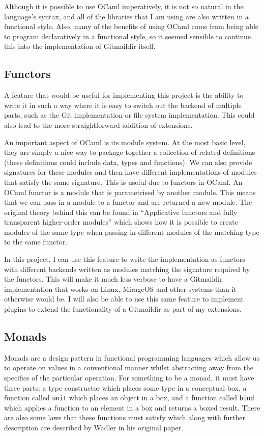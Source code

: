 Although it is possible to use OCaml imperatively, it is not so natural in the language's syntax, and all of the libraries that I am using are also written in a functional style. Also, many of the benefits of using OCaml come from being able to program declaratively in a functional style, so it seemed sensible to continue this into the implementation of Gitmaildir itself.

\subsection{Functors}

A feature that would be useful for implementing this project is the ability to write it in such a way where it is easy to switch out the backend of multiple parts, such as the Git implementation or file system implementation. This could also lead to the more straightforward addition of extensions.

An important aspect of OCaml is its module system. At the most basic level, they are simply a nice way to package together a collection of related definitions (these definitions could include data, types and functions). We can also provide signatures for these modules and then have different implementations of modules that satisfy the same signature. This is useful due to functors in OCaml. An OCaml functor is a module that is parametrised by another module. This means that we can pass in a module to a functor and are returned a new module. The original theory behind this can be found in ``Applicative functors and fully transparent higher-order modules''\cite{leroy1995functors} which shows how it is possible to create modules of the same type when passing in different modules of the matching type to the same functor.

In this project, I can use this feature to write the implementation as functors with different backends written as modules matching the signature required by the functors. This will make it much less verbose to have a Gitmaildir implementation that works on Linux, MirageOS and other systems than it otherwise would be. I will also be able to use this same feature to implement plugins to extend the functionality of a Gitmaildir as part of my extensions.

\subsection{Monads}

Monads are a design pattern in functional programming languages which allow us to operate on values in a conventional manner whilst abstracting away from the specifics of the particular operation. For something to be a monad, it must have three parts: a type constructor which places some type in a conceptual box, a function called \texttt{unit} which places an object in a box, and a function called \texttt{bind} which applies a function to an element in a box and returns a boxed result. There are also some laws that these functions must satisfy which along with further description are described by Wadler in his original paper\cite{wadler90monads}.

